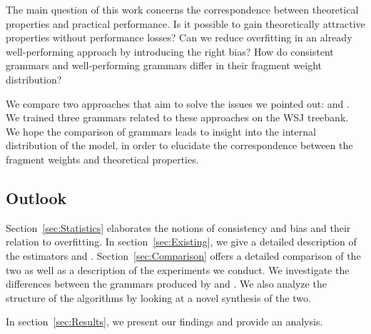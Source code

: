 The main question of this work concerns the correspondence between theoretical properties and practical performance. Is it possible to gain theoretically attractive properties without performance losses? Can we reduce overfitting in an already well-performing approach by introducing the right bias? How do consistent grammars and well-performing grammars differ in their fragment weight distribution? 

We compare two approaches that aim to solve the issues we pointed out: \ddop{} \cite{sangati2011} and \dops{} \cite{zollmann2005}. 
We trained three grammars related to these approaches on the WSJ treebank. We hope the comparison of grammars leads to insight into the internal distribution of the model, in order to elucidate the correspondence between the fragment weights and theoretical properties.

\subsection{Outlook}
Section~\ref{sec:Statistics} elaborates the notions of consistency and bias and their relation to overfitting.
In section~\ref{sec:Existing}, we give a detailed description of the estimators \ddop{} and \dops{}.
Section~\ref{sec:Comparison} offers a detailed comparison of the two as well as a description of the experiments we conduct. 
We investigate the differences between the grammars produced by \ddop{} and \dops{}. We also analyze the structure of the algorithms by looking at a novel synthesis of the two.

In section~\ref{sec:Results}, we present our findings and provide an analysis. 


